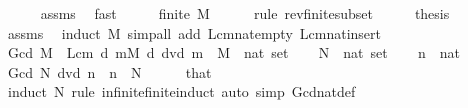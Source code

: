 \begin{isabellebody}
\ \ \ \ \isamarkupfalse%
\ assms\ \isamarkupfalse%
\ fast\isanewline
\ \ \isamarkupfalse%
\ \isamarkupfalse%
\ {\isachardoublequoteopen}finite\ M{\isachardoublequoteclose}\isanewline
\ \ \ \ \isamarkupfalse%
\ {\isacharparenleft}{\kern0pt}rule\ rev{\isacharunderscore}{\kern0pt}finite{\isacharunderscore}{\kern0pt}subset{\isacharparenright}{\kern0pt}\isanewline
\ \ \isamarkupfalse%
\ \isamarkupfalse%
\ {\isacharquery}{\kern0pt}thesis\isanewline
\ \ \ \ \isamarkupfalse%
\ assms\ \isamarkupfalse%
\ {\isacharparenleft}{\kern0pt}induct\ M{\isacharparenright}{\kern0pt}\ {\isacharparenleft}{\kern0pt}simp{\isacharunderscore}{\kern0pt}all\ add{\isacharcolon}{\kern0pt}\ Lcm{\isacharunderscore}{\kern0pt}nat{\isacharunderscore}{\kern0pt}empty\ Lcm{\isacharunderscore}{\kern0pt}nat{\isacharunderscore}{\kern0pt}insert{\isacharparenright}{\kern0pt}\isanewline
{}\isamarkupfalse%
%
\endisatagproof
{\isafoldproof}%
%
\isadelimproof
\isanewline
%
\endisadelimproof
\isanewline
{}\isamarkupfalse%
\ {\isachardoublequoteopen}Gcd\ M\ {\isacharequal}{\kern0pt}\ Lcm\ {\isacharbraceleft}{\kern0pt}d{\isachardot}{\kern0pt}\ {\isasymforall}m{\isasymin}M{\isachardot}{\kern0pt}\ d\ dvd\ m{\isacharbraceright}{\kern0pt}{\isachardoublequoteclose}\ \ M\ {\isacharcolon}{\kern0pt}{\isacharcolon}{\kern0pt}\ {\isachardoublequoteopen}nat\ set{\isachardoublequoteclose}\isanewline
\isanewline
{}\isamarkupfalse%
\isanewline
%
\isadelimproof
%
\endisadelimproof
%
\isatagproof
{}\isamarkupfalse%
\isanewline
\ \ \isamarkupfalse%
\ N\ {\isacharcolon}{\kern0pt}{\isacharcolon}{\kern0pt}\ {\isachardoublequoteopen}nat\ set{\isachardoublequoteclose}\isanewline
\ \ \isamarkupfalse%
\ n\ {\isacharcolon}{\kern0pt}{\isacharcolon}{\kern0pt}\ nat\isanewline
\ \ \isamarkupfalse%
\ {\isachardoublequoteopen}Gcd\ N\ dvd\ n{\isachardoublequoteclose}\ \ {\isachardoublequoteopen}n\ {\isasymin}\ N{\isachardoublequoteclose}\isanewline
\ \ \ \ \isamarkupfalse%
\ that\ \isamarkupfalse%
\ {\isacharparenleft}{\kern0pt}induct\ N\ rule{\isacharcolon}{\kern0pt}\ infinite{\isacharunderscore}{\kern0pt}finite{\isacharunderscore}{\kern0pt}induct{\isacharparenright}{\kern0pt}\ {\isacharparenleft}{\kern0pt}auto\ simp{\isacharcolon}{\kern0pt}\ Gcd{\isacharunderscore}{\kern0pt}nat{\isacharunderscore}{\kern0pt}def{\isacharparenright}{\kern0pt}\isanewline

\end{isabellebody}
